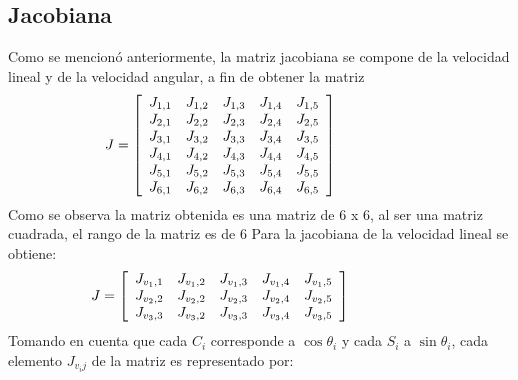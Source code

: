 \subsection{Jacobiana} %
Como se mencionó anteriormente, la matriz jacobiana se compone de la velocidad lineal y de la velocidad angular, a
fin de obtener la matriz
\begin{equation*}
    \hspace{-10mm}
    J = \left[
        \begin{array}{ccccc}
            J_{1,1} & J_{1,2} & J_{1,3} & J_{1,4} & J_{1,5}\\
            J_{2,1} & J_{2,2} & J_{2,3} & J_{2,4} & J_{2,5}\\
            J_{3,1} & J_{3,2} & J_{3,3} & J_{3,4} & J_{3,5}\\
            J_{4,1} & J_{4,2} & J_{4,3} & J_{4,4} & J_{4,5}\\
            J_{5,1} & J_{5,2} & J_{5,3} & J_{5,4} & J_{5,5}\\
            J_{6,1} & J_{6,2} & J_{6,3} & J_{6,4} & J_{6,5}\\
        \end{array} \right]
    \hspace{10mm}
\end{equation*}
Como se observa la matriz obtenida es una matriz de 6 x 6, al ser una matriz cuadrada, el rango de la matriz es de 6
Para la jacobiana de la velocidad lineal se obtiene: 
\begin{equation*}
    \hspace{-10mm}
    J = \left[
        \begin{array}{ccccc}
            J_{v_1 ,1} & J_{v_1 ,2} & J_{v_1 ,3} & J_{v_1 ,4} & J_{v_1 ,5}\\
            J_{v_2 ,2} & J_{v_2 ,2} & J_{v_2 ,3} & J_{v_2 ,4} & J_{v_2 ,5}\\
            J_{v_3 ,3 } & J_{v_3,2} & J_{v_3 ,3} & J_{v_3 ,4} & J_{v_3 ,5}\\
        \end{array}\right] \hspace{10mm}
\end{equation*} 
\noindent Tomando en cuenta que cada $C_i$ corresponde a $\cos \theta_i$ y cada $S_i$ a $\sin \theta_i$, cada elemento
$J_{v_ij}$ de la matriz es representado por:


